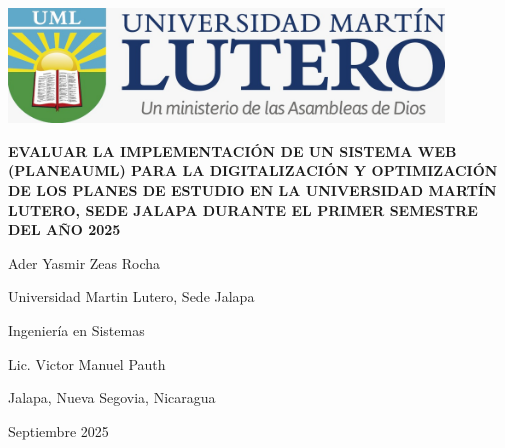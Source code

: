 \begin{titlepage}
     \par
    \vspace{0.5in}
    \centering
    \singlespacing

    \includegraphics[height=1.2in,keepaspectratio]{figuras/logo.jpeg}
    \vspace{0.5in}

    \textbf{EVALUAR LA IMPLEMENTACIÓN DE UN SISTEMA WEB (PLANEAUML) PARA LA DIGITALIZACIÓN Y OPTIMIZACIÓN DE LOS PLANES DE ESTUDIO EN LA UNIVERSIDAD MARTÍN LUTERO, SEDE JALAPA DURANTE EL PRIMER SEMESTRE DEL AÑO 2025} \par

    \vspace{1.5in}

    Ader Yasmir Zeas Rocha \par

    \vspace{0.5\baselineskip}

    Universidad Martin Lutero, Sede Jalapa \par

    \vspace{0.5\baselineskip}

    Ingeniería en Sistemas \par

    \vspace{0.5\baselineskip}

    Lic. Victor Manuel Pauth \par

    \vspace{0.5\baselineskip}

    Jalapa, Nueva Segovia, Nicaragua \par

    \vspace{0.5\baselineskip}

    Septiembre 2025 \par

\end{titlepage}